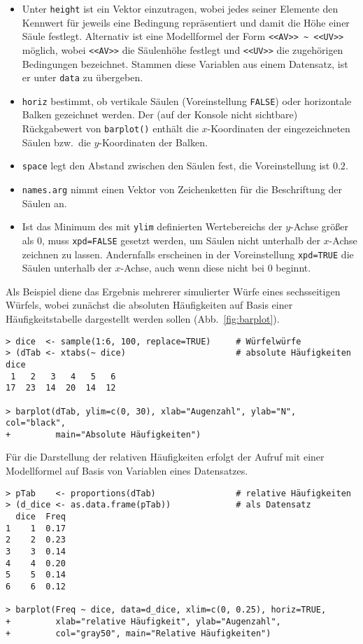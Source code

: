 \begin{itemize}
\item Unter \lstinline!height! ist ein Vektor einzutragen, wobei jedes seiner Elemente den Kennwert für jeweils eine Bedingung repräsentiert und damit die Höhe einer Säule festlegt. Alternativ ist eine Modellformel der Form \lstinline!<<AV>> ~ <<UV>>! möglich, wobei \lstinline!<<AV>>! die Säulenhöhe festlegt und \lstinline!<<UV>>! die zugehörigen Bedingungen bezeichnet. Stammen diese Variablen aus einem Datensatz, ist er unter \lstinline!data! zu übergeben.
\item \lstinline!horiz! bestimmt, ob vertikale Säulen (Voreinstellung \lstinline!FALSE!) oder horizontale Balken gezeichnet werden. Der (auf der Konsole nicht sichtbare) Rückgabewert von \lstinline!barplot()! enthält die $x$-Koordinaten der eingezeichneten Säulen bzw.\ die $y$-Koordinaten der Balken.
\item \lstinline!space! legt den Abstand zwischen den Säulen fest, die Voreinstellung ist $0.2$.
\item \lstinline!names.arg! nimmt einen Vektor von Zeichenketten für die Beschriftung der Säulen an.
\item Ist das Minimum des mit \lstinline!ylim! definierten Wertebereichs der $y$-Achse größer als $0$, muss \lstinline!xpd=FALSE! gesetzt werden, um Säulen nicht unterhalb der $x$-Achse zeichnen zu lassen. Andernfalls erscheinen in der Voreinstellung \lstinline!xpd=TRUE! die Säulen unterhalb der $x$-Achse, auch wenn diese nicht bei $0$ beginnt.
\end{itemize}

Als Beispiel diene das Ergebnis mehrerer simulierter Würfe eines sechsseitigen Würfels, wobei zunächst die absoluten Häufigkeiten auf Basis einer Häufigkeitstabelle dargestellt werden sollen (Abb.\ \ref{fig:barplot}).
\begin{lstlisting}
> dice  <- sample(1:6, 100, replace=TRUE)     # Würfelwürfe
> (dTab <- xtabs(~ dice)                      # absolute Häufigkeiten
dice
 1   2   3   4   5   6
17  23  14  20  14  12

> barplot(dTab, ylim=c(0, 30), xlab="Augenzahl", ylab="N", col="black",
+         main="Absolute Häufigkeiten")
\end{lstlisting}

Für die Darstellung der relativen Häufigkeiten erfolgt der Aufruf mit einer Modellformel auf Basis von Variablen eines Datensatzes.
\begin{lstlisting}
> pTab    <- proportions(dTab)                # relative Häufigkeiten
> (d_dice <- as.data.frame(pTab))             # als Datensatz
  dice  Freq
1    1  0.17
2    2  0.23
3    3  0.14
4    4  0.20
5    5  0.14
6    6  0.12

> barplot(Freq ~ dice, data=d_dice, xlim=c(0, 0.25), horiz=TRUE,
+         xlab="relative Häufigkeit", ylab="Augenzahl",
+         col="gray50", main="Relative Häufigkeiten")
\end{lstlisting}

